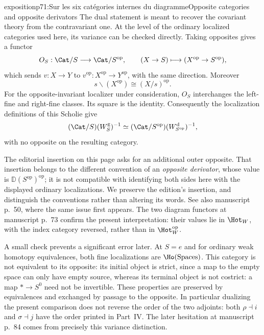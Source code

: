 \begin{dcomment}{exposition}{p71:Sur les six catégories internes du diagramme}{Opposite categories and opposite derivators}
The dual statement is meant to recover the covariant theory from the contravariant one. At the level of the ordinary localized categories used here, its variance can be checked directly. Taking opposites gives a functor
\[
 O_S:\Cat/S\longrightarrow\Cat/S^{\mathrm{op}},
 \qquad (X\to S)\longmapsto(X^{\mathrm{op}}\to S^{\mathrm{op}}),
\]
which sends $v:X\to Y$ to $v^{\mathrm{op}}:X^{\mathrm{op}}\to Y^{\mathrm{op}}$, with the same direction. Moreover
\[
 s\backslash(X^{\mathrm{op}})\cong(X/s)^{\mathrm{op}}.
\]
For the opposite-invariant localizer under consideration, $O_S$ interchanges the left-fine and right-fine classes. Its square is the identity. Consequently the localization definitions of this Scholie give
\[
 (\Cat/S)(W_S^{\mathrm g})^{-1}
       \simeq(\Cat/S^{\mathrm{op}})(W_{S^{\mathrm{op}}}^{\mathrm d})^{-1},
\]
with no opposite on the resulting category.

The editorial insertion on this page asks for an additional outer opposite. That insertion belongs to the different convention of an \emph{opposite derivator}, whose value is $\mathbb D(S^{\mathrm{op}})^{\mathrm{op}}$; it is not compatible with identifying both sides here with the displayed ordinary localizations. We preserve the edition's insertion, and distinguish the conventions rather than altering its words. See also manuscript p.~50, where the same issue first appears. The two diagram functors at manuscript p.~73 confirm the present interpretation: their values lie in $\Hot_W$, with the index category reversed, rather than in $\Hot_W^{\mathrm{op}}$.

A small check prevents a significant error later. At $S=e$ and for ordinary weak homotopy equivalences, both fine localizations are $\Ho(\mathrm{Spaces})$. This category is not equivalent to its opposite: its initial object is strict, since a map to the empty space can only have empty source, whereas its terminal object is not costrict: a map $*\to S^0$ need not be invertible. These properties are preserved by equivalences and exchanged by passage to the opposite. In particular dualizing the present comparison does not reverse the order of the two adjoints: both $\rho\dashv i$ and $\sigma\dashv j$ have the order printed in Part~IV. The later hesitation at manuscript p.~84 comes from precisely this variance distinction.
\end{dcomment}

